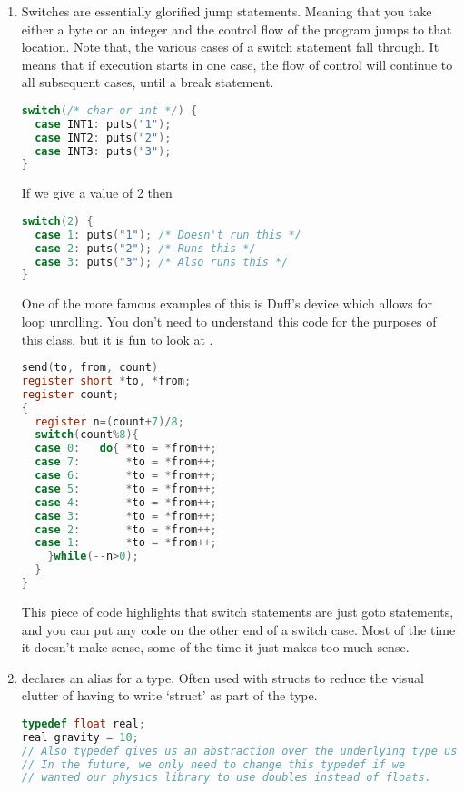 \begin{enumerate}
	    \item {} Switches are essentially glorified jump statements.
        Meaning that you take either a byte or an integer and the control flow of the program jumps to that location.
        Note that, the various cases of a switch statement fall through. It means that if execution starts in one case, the flow of control will continue to all subsequent cases, until a break statement.
	      \\
	      \begin{lstlisting}[language=C]
switch(/* char or int */) {
  case INT1: puts("1");
  case INT2: puts("2");
  case INT3: puts("3");
}
\end{lstlisting}

	      If we give a value of 2 then
	      \\
	      \begin{lstlisting}[language=C]
switch(2) {
  case 1: puts("1"); /* Doesn't run this */
  case 2: puts("2"); /* Runs this */
  case 3: puts("3"); /* Also runs this */
}
\end{lstlisting}

        One of the more famous examples of this is Duff's device which allows for loop unrolling. You don't need to understand this code for the purposes of this class, but it is fun to look at \cite{duff}.

        \begin{lstlisting}[language=C]
send(to, from, count)
register short *to, *from;
register count;
{
  register n=(count+7)/8;
  switch(count%8){
  case 0:	do{	*to = *from++;
  case 7:		*to = *from++;
  case 6:		*to = *from++;
  case 5:		*to = *from++;
  case 4:		*to = *from++;
  case 3:		*to = *from++;
  case 2:		*to = *from++;
  case 1:		*to = *from++;
    }while(--n>0);
  }
}
\end{lstlisting}
        This piece of code highlights that switch statements are just goto statements, and you can put any code on the other end of a switch case.
        Most of the time it doesn't make sense, some of the time it just makes too much sense.

	    \item {} declares an alias for a type.
        Often used with structs to reduce the visual clutter of having to write `struct' as part of the type.

	      \begin{lstlisting}[language=C]
typedef float real;
real gravity = 10;
// Also typedef gives us an abstraction over the underlying type used.
// In the future, we only need to change this typedef if we
// wanted our physics library to use doubles instead of floats.


\end{lstlisting}
\end{enumerate}
